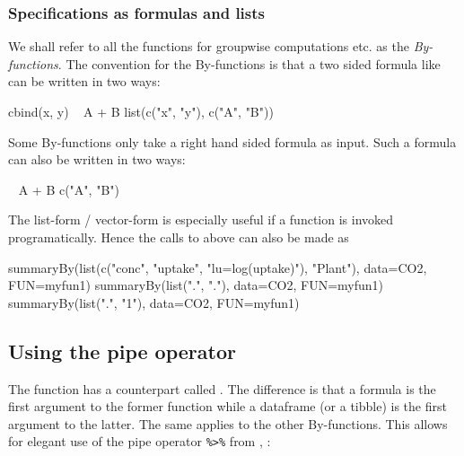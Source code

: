 \hypertarget{specifications-as-formulas-and-lists}{%
\subsubsection{Specifications as formulas and
lists}\label{specifications-as-formulas-and-lists}}

We shall refer to all the functions for groupwise computations etc. as
the \emph{By-functions}. The convention for the By-functions is that a
two sided formula like can be written in two ways:

\begin{Schunk}
\begin{Sinput}
cbind(x, y) ~ A + B
list(c("x", "y"), c("A", "B"))
\end{Sinput}
\end{Schunk}

Some By-functions only take a right hand sided formula as input. Such a
formula can also be written in two ways:

\begin{Schunk}
\begin{Sinput}
~ A + B
c("A", "B")
\end{Sinput}
\end{Schunk}

The list-form / vector-form is especially useful if a function is
invoked programatically. Hence the calls to  above can
also be made as

\begin{Schunk}
\begin{Sinput}
summaryBy(list(c("conc", "uptake", "lu=log(uptake)"), "Plant"), data=CO2, FUN=myfun1)
summaryBy(list(".", "."), data=CO2, FUN=myfun1)
summaryBy(list(".", "1"), data=CO2, FUN=myfun1)
\end{Sinput}
\end{Schunk}

\hypertarget{using-the-pipe-operator}{%
\subsection{Using the pipe operator}\label{using-the-pipe-operator}}

The  function has a counterpart called
. The difference is that a formula is the first
argument to the former function while a dataframe (or a tibble) is the
first argument to the latter. The same applies to the other
By-functions. This allows for elegant use of the pipe operator
\texttt{\%\textgreater{}\%} from , \citep{magrittr}:

